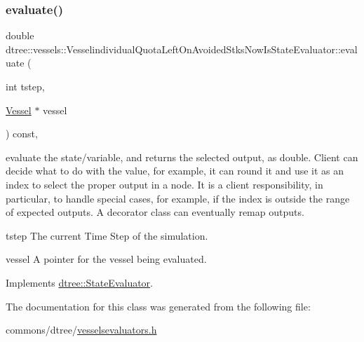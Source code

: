 \subsubsection{\texorpdfstring{evaluate()}{evaluate()}}
{\footnotesize\ttfamily double dtree\+::vessels\+::\+Vesselindividual\+Quota\+Left\+On\+Avoided\+Stks\+Now\+Is\+State\+Evaluator\+::evaluate (\begin{DoxyParamCaption}\item[{int}]{tstep,  }\item[{\mbox{\hyperlink{class_vessel}{Vessel}} $\ast$}]{vessel }\end{DoxyParamCaption}) const\hspace{0.3cm}{\ttfamily [inline]}, {\ttfamily [virtual]}}



evaluate the state/variable, and returns the selected output, as double. Client can decide what to do with the value, for example, it can round it and use it as an index to select the proper output in a node. It is a client responsibility, in particular, to handle special cases, for example, if the index is outside the range of expected outputs. A decorator class can eventually remap outputs. 

\begin{DoxyItemize}
\item tstep The current Time Step of the simulation. \item vessel A pointer for the vessel being evaluated. \end{DoxyItemize}


Implements \mbox{\hyperlink{classdtree_1_1_state_evaluator_ab57666219fbdc728f40d9d5acd5726cb}{dtree\+::\+State\+Evaluator}}.



The documentation for this class was generated from the following file\+:\begin{DoxyCompactItemize}
\item 
commons/dtree/\mbox{\hyperlink{vesselsevaluators_8h}{vesselsevaluators.\+h}}\end{DoxyCompactItemize}
